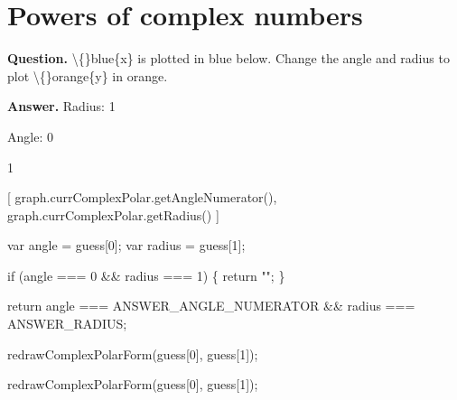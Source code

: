 \documentclass{article}
\begin{document}
\section*{Powers of complex numbers}
\textbf{Question.} \textbackslash\{\}blue\{x\} is plotted in blue below.
                Change the angle and radius to plot \textbackslash\{\}orange\{y\} in orange.

\textbf{Answer.} Radius: 1
                        
                            
                            
                        
                    
                    
                        Angle: 0
                        
                            
                            
                        
                    
                    1
                
                [
                    graph.currComplexPolar.getAngleNumerator(),
                    graph.currComplexPolar.getRadius()
                    ]
                
                    var angle = guess[0];
                    var radius = guess[1];

                    if (angle === 0 \&\& radius === 1) \{
                        return "";
                    \}

                    return angle === ANSWER\_ANGLE\_NUMERATOR \&\& radius === ANSWER\_RADIUS;
                
                
                    redrawComplexPolarForm(guess[0], guess[1]);
                
                
                    redrawComplexPolarForm(guess[0], guess[1]);
\end{document}
